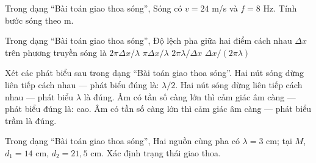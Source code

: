 \begin{ex}
Trong dạng “Bài toán giao thoa sóng”, Sóng có $v=24$ m/s và $f=8$ Hz. Tính bước sóng theo m.
\end{ex}

\begin{ex}
Trong dạng “Bài toán giao thoa sóng”, Độ lệch pha giữa hai điểm cách nhau $\Delta x$ trên phương truyền sóng là
\choice
{\True $2\pi\Delta x/\lambda$}
{$\pi\Delta x/\lambda$}
{$2\pi\lambda/\Delta x$}
{$\Delta x/(2\pi\lambda)$}
\end{ex}

\begin{ex}
Xét các phát biểu sau trong dạng “Bài toán giao thoa sóng”.
\choiceTF
{\True Hai nút sóng dừng liên tiếp cách nhau — phát biểu đúng là: $\lambda/2$.}
{Hai nút sóng dừng liên tiếp cách nhau — phát biểu $\lambda$ là đúng.}
{\True Âm có tần số càng lớn thì cảm giác âm càng — phát biểu đúng là: cao.}
{Âm có tần số càng lớn thì cảm giác âm càng — phát biểu trầm là đúng.}
\end{ex}

\begin{ex}
Trong dạng “Bài toán giao thoa sóng”, Hai nguồn cùng pha có $\lambda=3$ cm; tại $M$, $d_1=14$ cm, $d_2=21,5$ cm. Xác định trạng thái giao thoa.
\choiceTF

\end{ex}

